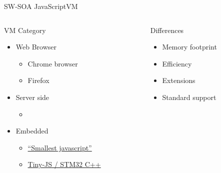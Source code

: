 %
\begin{Frame}{SW-SOA JavaScriptVM}
  \begin{columns}[t]
    \begin{column}{\HW} %
      \begin{block}{VM Category}
        \begin{itemize}
        \item Web Browser
          \begin{itemize}
          \item
             Chrome browser
          \item
             Firefox
          \end{itemize}
        \item Server side 
          \begin{itemize}
          \item {}
          \end{itemize}
        \item Embedded
          \begin{itemize}
          \item \href{https://github.com/cesanta/v7/}{``Smallest javascript''}
          \item \href{https://github.com/snoozbuster/tiny-js}{Tiny-JS
              / STM32 C++}
          \end{itemize}
        \end{itemize}
      \end{block} 
    \end{column}
    
    \begin{column}{\HW} %
      \begin{block}{Differences}
        \begin{itemize}
        \item Memory footprint
        \item Efficiency
        \item Extensions
        \item Standard support
        \end{itemize}
      \end{block}   
    \end{column}
  \end{columns}  
\end{Frame}


